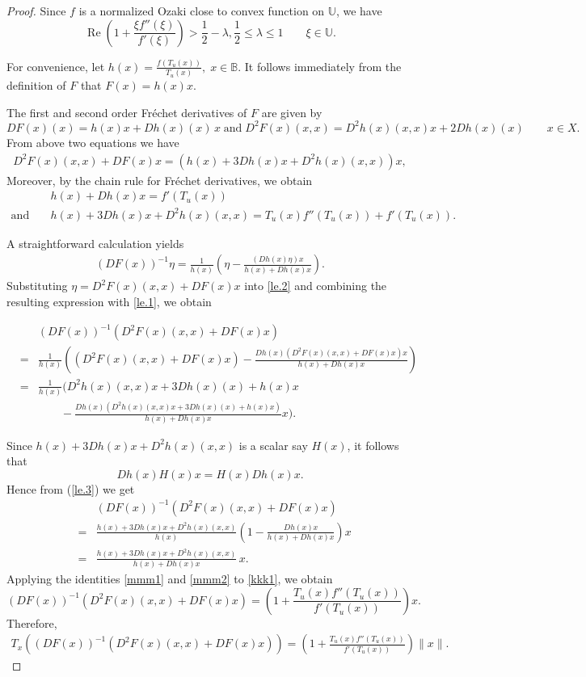 \documentclass[11pt, reqno]{amsart}
\numberwithin{equation}{section}
\newcommand{\bea}{\begin{eqnarray}}
\newcommand{\eea}{\end{eqnarray}}
\begin{document}
\begin{proof}
Since $f$ is a normalized Ozaki close to convex  function on $\mathbb{U}$, we have
\begin{equation}
\operatorname{Re}\left(1+\frac{\xi f''(\xi)}{f'(\xi)}\right)>\frac{1}{2}-\lambda, \frac{1}{2}\leq \lambda \leq 1
\qquad \xi\in\mathbb{U}.
\label{eq:spiral}
\end{equation}

For convenience, let $h(x)=\frac{f(T_u(x))}{T_u(x)},\; x\in\mathbb{B}.$ It follows immediately from the definition of $F$ that $F(x)=h(x)x.$

The first and second order Fr\'echet derivatives of $F$ are given by
\[
DF(x)(x)=h(x)x+Dh(x)(x)\,x\;\text{and}\; D^2F(x)(x,x)=D^2h(x)(x,x)x+2Dh(x)(x)\qquad x\in X.
\]
From above two equations we have 
\bea\label{le.1}
D^2F(x)(x,x)+DF(x)x
=
\left(h(x)+3Dh(x)x+D^2h(x)(x,x)\right)x,
\eea
Moreover, by the chain rule for Fr\'echet derivatives, we obtain
\bea\label{mmm1}
&& h(x)+Dh(x)x=f'(T_u(x))\\
\label{mmm2}\text{and}\;&& h(x)+3Dh(x)x+D^2h(x)(x,x)=T_u(x)f''(T_u(x))+f'(T_u(x)).
\eea

A straightforward calculation yields
\bea\label{le.2}
(DF(x))^{-1}\eta
=
\frac1{h(x)}
\left(
\eta-\frac{(Dh(x)\eta) x}
{h(x)+Dh(x)x}
\right).
\eea
Substituting $\eta=D^2F(x)(x,x)+DF(x)x$ into \eqref{le.2} and combining the resulting expression with \eqref{le.1}, we obtain

\bea\label{le.3}
&&(DF(x))^{-1}(D^2F(x)(x,x)+DF(x)x)\nonumber\\
&=&
\frac{1}{h(x)}\left((D^2F(x)(x,x)+DF(x)x)-\frac{Dh(x)(D^2F(x)(x,x)+DF(x)x)x}
{h(x)+Dh(x)x}\right)\nonumber\\
&=&\frac{1}{h(x)}\bigg(D^2h(x)(x,x)x+3Dh(x)(x)+h(x)x
\nonumber\\
&&\quad\quad-\frac{Dh(x)(D^2h(x)(x,x)x+3Dh(x)(x)+h(x)x)}
{h(x)+Dh(x)x}x\bigg).\eea


Since \(h(x)+3Dh(x)x+D^2h(x)(x,x)\) is a scalar say $H(x)$, it follows that
\[
Dh(x)H(x)x
=H(x)Dh(x)x.
\]
Hence from (\ref{le.3}) we get
\bea\label{kkk1}
&&(DF(x))^{-1}\left(D^2F(x)(x,x)+DF(x)x\right)\nonumber\\
&=&
\frac{h(x)+3Dh(x)x+D^2h(x)(x,x)}{h(x)}
\left(
1-\frac{Dh(x)x}{h(x)+Dh(x)x}
\right)x\nonumber\\
&=&
\frac{h(x)+3Dh(x)x+D^2h(x)(x,x)}
{h(x)+Dh(x)x}\,x.
\eea
Applying the identities \eqref{mmm1} and \eqref{mmm2} to \eqref{kkk1}, we obtain
\[
(DF(x))^{-1}\left(D^2F(x)(x,x)+DF(x)x\right)
=\left(1+\frac{T_u(x)f''(T_u(x))}{f'(T_u(x))}\right)x.
\]
Therefore,
\bea\label{f1}
T_x\!\left((DF(x))^{-1}\left(D^2F(x)(x,x)+DF(x)x\right)\right)=\left(1+\frac{T_u(x)f''(T_u(x))}{f'(T_u(x))}\right)\|x\|.
\eea


\end{proof}
\end{document}
